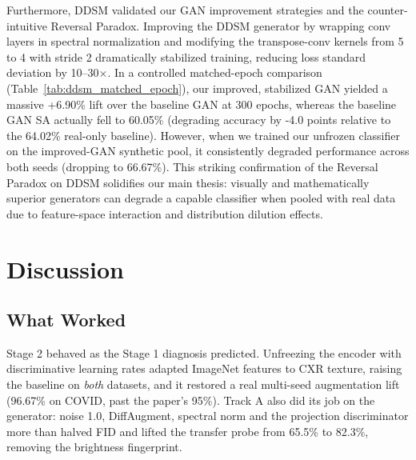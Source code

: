 \documentclass[11pt]{article}
\begin{document}
Furthermore, DDSM validated our GAN improvement strategies and the counter-intuitive Reversal Paradox. Improving the DDSM generator by wrapping conv layers in spectral normalization and modifying the transpose-conv kernels from 5 to 4 with stride 2 dramatically stabilized training, reducing loss standard deviation by 10--30$\times$. In a controlled matched-epoch comparison (Table~\ref{tab:ddsm_matched_epoch}), our improved, stabilized GAN yielded a massive +6.90\% lift over the baseline GAN at 300 epochs, whereas the baseline GAN SA actually fell to 60.05\% (degrading accuracy by -4.0 points relative to the 64.02\% real-only baseline). However, when we trained our unfrozen classifier on the improved-GAN synthetic pool, it consistently degraded performance across both seeds (dropping to 66.67\%). This striking confirmation of the Reversal Paradox on DDSM solidifies our main thesis: visually and mathematically superior generators can degrade a capable classifier when pooled with real data due to feature-space interaction and distribution dilution effects.

\section{Discussion} \label{sec:discussion}

\subsection{What Worked}
Stage 2 behaved as the Stage 1 diagnosis predicted. Unfreezing the encoder with discriminative learning rates adapted ImageNet features to CXR texture, raising the baseline on \emph{both} datasets, and it restored a real multi-seed augmentation lift (96.67\% on COVID, past the paper's 95\%). Track A also did its job on the generator: noise 1.0, DiffAugment, spectral norm and the projection discriminator more than halved FID and lifted the transfer probe from 65.5\% to 82.3\%, removing the brightness fingerprint.
\end{document}

